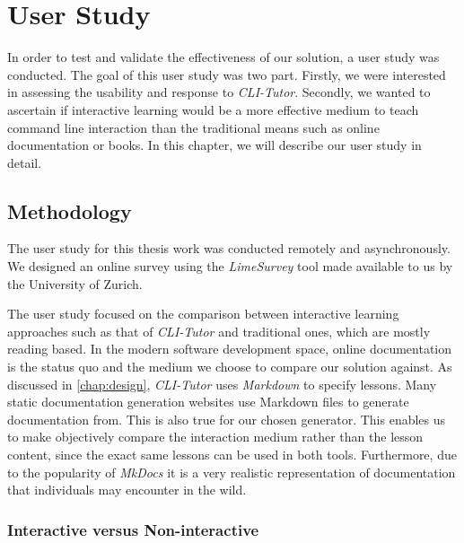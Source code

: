 \chapter{User Study}
\label{chap:userstudy}

In order to test and validate the effectiveness of our solution, a user study
was conducted. The goal of this user study was two part. Firstly, we were
interested in assessing the usability and response to \textit{CLI-Tutor}.
Secondly, we wanted to ascertain if interactive learning would be a more
effective medium to teach command line interaction than the traditional means
such as online documentation or books. In this chapter, we will describe our
user study in detail.


\section{Methodology}

The user study for this thesis work was conducted remotely and asynchronously.
We designed an online survey using the \textit{LimeSurvey}\cite{schmitzlime}
tool made available to us by the University of Zurich.

The user study focused on the comparison between interactive learning
approaches such as that of \textit{CLI-Tutor} and traditional ones, which are
mostly reading based. In the modern software development space, online
documentation is the status quo and the medium we choose to compare our
solution against. As discussed in \autoref{chap:design}, \textit{CLI-Tutor}
uses \textit{Markdown} to specify lessons. Many static documentation generation
websites use Markdown files to generate documentation from. This is also true
for our chosen generator. This enables us to make objectively compare the
interaction medium rather than the lesson content, since the exact same lessons
can be used in both tools. Furthermore, due to the popularity of
\textit{MkDocs} it is a very realistic representation of documentation that
individuals may encounter in the wild.


\subsection{Interactive versus Non-interactive}

